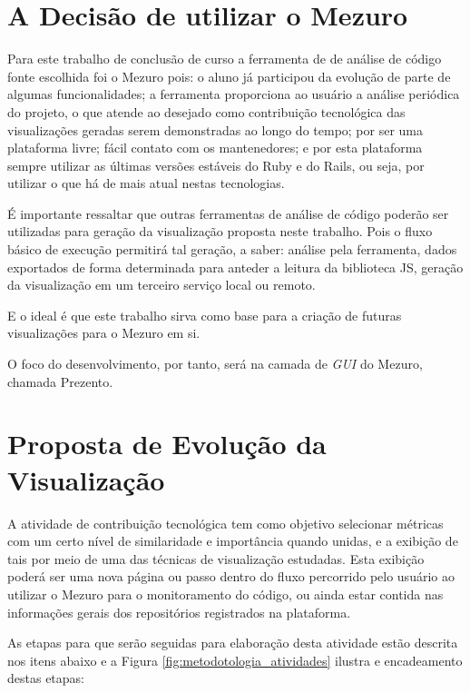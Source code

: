 \newpage

\section{A Decisão de utilizar o Mezuro}

Para este trabalho de conclusão de curso a ferramenta de de análise de código
fonte escolhida foi o Mezuro pois: o aluno já participou da evolução de parte
de algumas funcionalidades; a ferramenta proporciona ao usuário a análise
periódica do projeto, o que atende ao desejado como contribuição tecnológica
das visualizações geradas serem demonstradas ao longo do tempo; por ser uma
plataforma livre; fácil contato com os mantenedores; e por esta plataforma
sempre utilizar as últimas versões estáveis do Ruby e do Rails, ou seja,
por utilizar o que há de mais atual nestas tecnologias.

É importante ressaltar que outras ferramentas de análise de código poderão ser
utilizadas para geração da visualização proposta neste trabalho. Pois o fluxo
básico de execução permitirá tal geração, a saber: análise pela ferramenta,
dados exportados de forma determinada para anteder a leitura da biblioteca JS,
geração da visualização em um terceiro serviço local ou remoto.

E o ideal é que este trabalho sirva como base para a criação de futuras
visualizações para o Mezuro em si.

O foco do desenvolvimento, por tanto, será na camada de \textit{GUI} do Mezuro,
chamada Prezento.

\section{Proposta de Evolução da Visualização}

A atividade de contribuição tecnológica tem como objetivo selecionar métricas
com um certo nível  de similaridade e importância quando unidas, e a exibição de
tais por meio de uma das técnicas de visualização estudadas. Esta exibição
poderá ser uma nova página ou passo dentro do fluxo percorrido pelo usuário ao
utilizar o Mezuro para o monitoramento do código, ou ainda estar contida nas
informações gerais dos repositórios registrados na plataforma.

As etapas para que serão seguidas para elaboração desta atividade estão descrita
nos itens abaixo e a Figura \ref{fig:metodotologia_atividades} ilustra e
encadeamento destas etapas:

